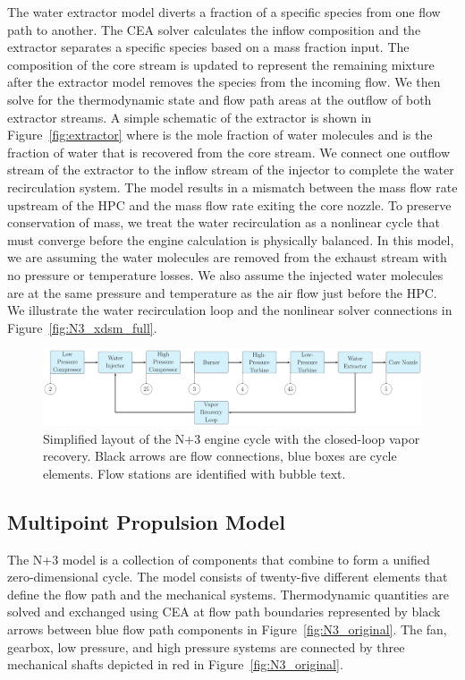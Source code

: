 \documentclass[conf]{new-aiaa}
\begin{document}
The water extractor model diverts a fraction of a specific species from one flow path to another.
The CEA solver calculates the inflow composition and the extractor separates a specific species based on a mass fraction input.
The composition of the core stream is updated to represent the remaining mixture after the extractor model removes the species from the incoming flow.
We then solve for the thermodynamic state and flow path areas at the outflow of both extractor streams.
A simple schematic of the extractor is shown in Figure~\ref{fig:extractor} where  is the mole fraction of water molecules and  is the fraction of water that is recovered from the core stream.
We connect one outflow stream of the extractor to the inflow stream of the injector to complete the water recirculation system.
The model results in a mismatch between the mass flow rate upstream of the HPC and the mass flow rate exiting the core nozzle.
To preserve conservation of mass, we treat the water recirculation as a nonlinear cycle that must converge before the engine calculation is physically balanced.
In this model, we are assuming the water molecules are removed from the exhaust stream with no pressure or temperature losses.
We also assume the injected water molecules are at the same pressure and temperature as the air flow just before the HPC.
We illustrate the water recirculation loop and the nonlinear solver connections in Figure~\ref{fig:N3_xdsm_full}.

\begin{figure}[hbt!]
  \centering
  \includegraphics[width=1.0\textwidth]{N3_CLVR_cycle.pdf}
  \caption{
    Simplified layout of the N+3 engine cycle with the closed-loop vapor recovery.
    Black arrows are flow connections, blue boxes are cycle elements.
    Flow stations are identified with bubble text.
  }
  \label{fig:n3_clvr}
\end{figure}

\subsection{Multipoint Propulsion Model}
The N+3 model is a collection of components that combine to form a unified zero-dimensional cycle.
The model consists of twenty-five different elements that define the flow path and the mechanical systems.
Thermodynamic quantities are solved and exchanged using CEA at flow path boundaries represented by black arrows between blue flow path components in Figure~\ref{fig:N3_original}.
The fan, gearbox, low pressure, and high pressure systems are connected by three mechanical shafts depicted in red in Figure~\ref{fig:N3_original}.
\end{document}
